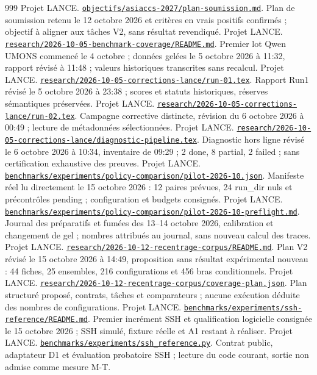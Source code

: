 \documentclass[11pt,a4paper]{article}
\newcommand{\source}[2]{\href{../../#1}{\nolinkurl{#1}}. #2}
\begin{document}
\begin{thebibliography}{999}
 Projet LANCE. \source{objectifs/asiaccs-2027/plan-soumission.md}{Plan de soumission retenu le 12 octobre 2026 et critères en vrais positifs confirmés ; objectif à aligner aux tâches V2, sans résultat revendiqué.}
 Projet LANCE. \source{research/2026-10-05-benchmark-coverage/README.md}{Premier lot Qwen UMONS commencé le 4 octobre ; données gelées le 5 octobre 2026 à 11:32, rapport révisé à 11:48 ; valeurs historiques transcrites sans recalcul.}
 Projet LANCE. \source{research/2026-10-05-corrections-lance/run-01.tex}{Rapport Run1 révisé le 5 octobre 2026 à 23:38 ; scores et statuts historiques, réserves sémantiques préservées.}
 Projet LANCE. \source{research/2026-10-05-corrections-lance/run-02.tex}{Campagne corrective distincte, révision du 6 octobre 2026 à 00:49 ; lecture de métadonnées sélectionnées.}
 Projet LANCE. \source{research/2026-10-05-corrections-lance/diagnostic-pipeline.tex}{Diagnostic hors ligne révisé le 6 octobre 2026 à 10:34, inventaire de 09:29 ; 2 done, 8 partial, 2 failed ; sans certification exhaustive des preuves.}
 Projet LANCE. \source{benchmarks/experiments/policy-comparison/pilot-2026-10.json}{Manifeste réel lu directement le 15 octobre 2026 : 12 paires prévues, 24 run\_dir nuls et précontrôles pending ; configuration et budgets consignés.}
 Projet LANCE. \source{benchmarks/experiments/policy-comparison/pilot-2026-10-preflight.md}{Journal des préparatifs et fumées des 13--14 octobre 2026, calibration et changement de gel ; nombres attribués au journal, sans nouveau calcul des traces.}
 Projet LANCE. \source{research/2026-10-12-recentrage-corpus/README.md}{Plan V2 révisé le 15 octobre 2026 à 14:49, proposition sans résultat expérimental nouveau : 44 fiches, 25 ensembles, 216 configurations et 456 bras conditionnels.}
 Projet LANCE. \source{research/2026-10-12-recentrage-corpus/coverage-plan.json}{Plan structuré proposé, contrats, tâches et comparateurs ; aucune exécution déduite des nombres de configurations.}
 Projet LANCE. \source{benchmarks/experiments/ssh-reference/README.md}{Premier incrément SSH et qualification logicielle consignée le 15 octobre 2026 ; SSH simulé, fixture réelle et A1 restant à réaliser.}
 Projet LANCE. \source{benchmarks/experiments/ssh_reference.py}{Contrat public, adaptateur D1 et évaluation probatoire SSH ; lecture du code courant, sortie non admise comme mesure M-T.}

\end{thebibliography}
\end{document}
